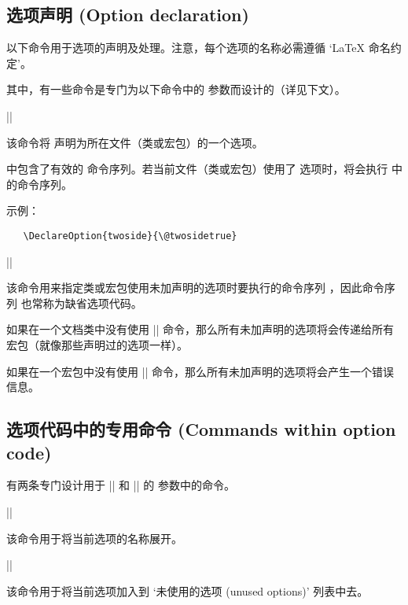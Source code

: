 \documentclass{ltxguide}[1995/11/28]
\renewcommand{\NEWdescription}[1]{%
   \hskip 1sp \marginpar{\small\sffamily\raggedright
     新描述\\#1}}
\begin{document}
\subsection{选项声明 (Option declaration)}
\label{Sec:commands.options.dec}

\NEWdescription{1998/12/01}
以下命令用于选项的声明及处理。注意，每个选项的名称必需遵循
 `\LaTeX{} 命名约定'。

其中，有一些命令是专门为以下命令中的  参数而设计的（详见下文）。

\begin{decl}
  |\DeclareOption|  
\end{decl}
该命令将  声明为所在文件（类或宏包）的一个选项。

 中包含了有效的 \LaTeXe{} 命令序列。若当前文件（类或宏包）使用了  选项时，将会执行  中的命令序列。

示例：
\begin{verbatim}
   \DeclareOption{twoside}{\@twosidetrue}
\end{verbatim}

\begin{decl}
  |\DeclareOption*| 
\end{decl}
该命令用来指定类或宏包使用未加声明的选项时要执行的命令序列 ，因此命令序列  也常称为缺省选项代码。

如果在一个文档类中没有使用 |\DeclareOption*| 命令，那么所有未加声明的选项将会传递给所有宏包（就像那些声明过的选项一样）。

如果在一个宏包中没有使用 |\DeclareOption*| 命令，那么所有未加声明的选项将会产生一个错误信息。

\subsection{选项代码中的专用命令 (Commands within option code)}
\label{Sec:within.code}

有两条专门设计用于 |\DeclareOption| 和 |\DeclareOption*| 的  参数中的命令。

\begin{decl}
  |\CurrentOption|
\end{decl}
该命令用于将当前选项的名称展开。

\begin{decl}
  |\OptionNotUsed|
\end{decl}
该命令用于将当前选项加入到 `未使用的选项 (unused options)' 列表中去。
\end{document}
